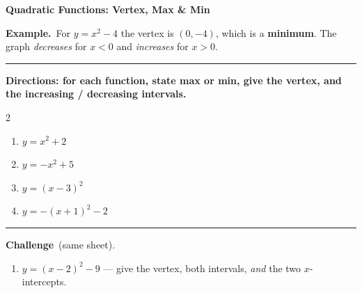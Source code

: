\documentclass[12pt]{article}
\begin{document}
\vspace{0.4cm}

\begin{center}{\Large\textbf{Quadratic Functions: Vertex, Max \& Min}}\end{center}
\vspace{0.15cm}

\textbf{Example.}\ For $y=x^{2}-4$ the vertex is $(0,-4)$, which is a \textbf{minimum}. The graph \emph{decreases} for $x<0$ and \emph{increases} for $x>0$.\\[4pt]
\begin{center}
\end{center}
\vspace{0.15cm}\hrule\vspace{0.4cm}

\textbf{Directions: for each function, state max or min, give the vertex, and the increasing / decreasing intervals.}\\[8pt]
\begin{multicols}{2}
\begin{enumerate}[label=\textbf{\arabic*.},itemsep=2.6cm]
\item $y=x^{2}+2$
\item $y=-x^{2}+5$
\item $y=(x-3)^{2}$
\item $y=-(x+1)^{2}-2$
\end{enumerate}
\end{multicols}

\vspace{0.1cm}\hrule\vspace{0.35cm}
\textbf{Challenge}\ (same sheet).\\[6pt]
\begin{enumerate}[label=\textbf{\arabic*.},start=5,itemsep=2.4cm]
\item $y=(x-2)^{2}-9$ --- give the vertex, both intervals, \emph{and} the two $x$-intercepts.
\end{enumerate}
\end{document}
